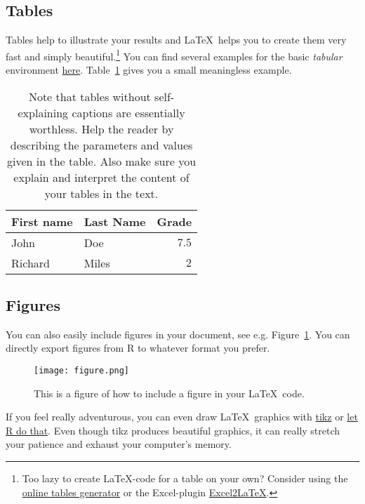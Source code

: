 \documentclass[a4paper, 12pt]{article}
\begin{document}
	\subsection{Tables}
	
	Tables help to illustrate your results and \LaTeX\ helps you to create them very fast and simply beautiful.\footnote{Too lazy to create \LaTeX-code for a table on your own? Consider using the \href{http://www.tablesgenerator.com/}{online tables generator} or the Excel-plugin \href{https://www.ctan.org/pkg/excel2latex}{Excel2\LaTeX}.} You can find several examples for the basic \emph{tabular} environment \href{https://en.wikibooks.org/wiki/LaTeX/Tables#The_tabular_environment}{here}. Table~\ref{tab:nameofthetable} gives you a small meaningless example.
	
	\begin{table}[h!]
		\centering
		\caption[How should a Table look like?]{Note that tables without self-explaining captions are essentially worthless. Help the reader by describing the parameters and values given in the table. Also make sure you explain and interpret the content of your tables in the text.}
		\begin{tabular}{llr}\toprule
			\textbf{First name} & \textbf{Last Name} & \textbf{Grade} \\\midrule
			John                           & Doe       & $7.5$ \\
			Richard                        & Miles     &   $2$ \\\bottomrule
		\end{tabular}
		\label{tab:nameofthetable}
	\end{table}
	
	\subsection{Figures}
	
	You can also easily include figures in your document, see e.g. Figure~\ref{fig:example}. You can directly export figures from R to whatever format you prefer. 
	
	\begin{figure}[htbp]
		\texttt{[image: figure.png]}
		\caption[Example for a Figure]{This is a figure of how to include a figure in your \LaTeX\ code.}
		\label{fig:example}
	\end{figure}
	
	If you feel really adventurous, you can even draw \LaTeX\ graphics with \href{http://www.texample.net/tikz/}{tikz} or \href{https://cran.r-project.org/web/packages/tikzDevice/vignettes/tikzDevice.pdf}{let R do that}. Even though tikz produces beautiful graphics, it can really stretch your patience and exhaust your computer's memory.
	
\end{document}
